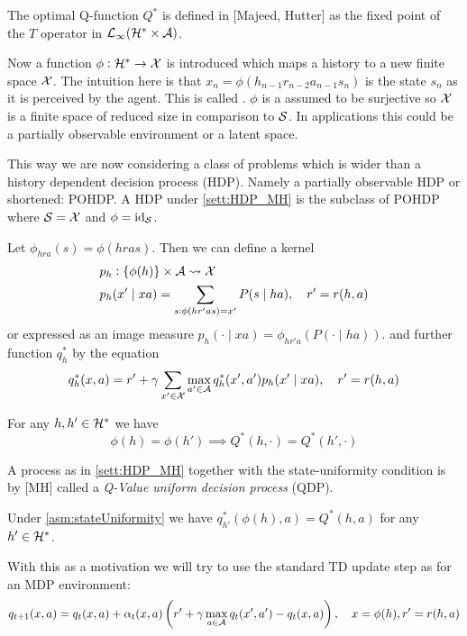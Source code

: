 The optimal Q-function $Q^*$ is defined in [Majeed, Hutter] as
the fixed point of the $T$ operator in
$\mathcal{L}_\infty(\mathcal{H}^* \times \mathcal{A})$.

Now a function $\phi : \mathcal{H}^* \to \mathcal{X}$ is introduced
which maps a history to a new finite space $\mathcal{X}$.
The intuition here is that $x_n = \phi(h_{n-1} r_{n-2} a_{n-1} s_n)$ is the
state $s_n$ as it is perceived by the agent.
This is called .
$\phi$ is a assumed to be surjective so $\mathcal{X}$ is a finite space of
reduced size in comparison to $\mathcal{S}$.
In applications this could be a partially observable environment
or a latent space.

This way we are now considering a class of problems
which is wider than a 
history dependent decision process (HDP).
Namely a partially observable HDP or shortened: POHDP.
A HDP under \cref{sett:HDP_MH} is the subclass of POHDP where
$\mathcal{S} = \mathcal{X}$ and $\phi = \text{id}_\mathcal{S}$.

Let $\phi_{hra}(s) = \phi(hras)$. Then we can define a kernel
\begin{align*} p_h & : \{\phi(h)\} \times \mathcal{A} \leadsto \mathcal{X}
  \\ p_h & (x' \mid xa)
  = \sum_{s:\phi(hr'as)=x'} P(s \mid ha), \quad r'=r(h,a)
\end{align*}
or expressed as an image measure
$p_h(\cdot \mid xa) = \phi_{hr'a}(P(\cdot \mid ha))$.
and further function $q_h^*$ by the equation
\[ q_h^*(x, a) = r' + \gamma \sum_{x' \in \mathcal{X}} 
\max_{a' \in \mathcal{A}} q^*_h(x', a')
p_h(x' \mid xa), \quad r'=r(h,a) \]

\begin{asm}
  For any $h,h' \in \mathcal{H}^*$ we have
  \[ \phi(h) = \phi(h') \implies Q^*(h, \cdot) = Q^*(h', \cdot) \]
  \label{asm:stateUniformity}
\end{asm}

A process as in \cref{sett:HDP_MH} together with the state-uniformity condition
is by [MH] called a \emph{Q-Value uniform decision process} (QDP).

\begin{thm}[Hutter, 2016]
  Under \cref{asm:stateUniformity} we have
  $q^*_{h'}(\phi(h), a) = Q^*(h, a)$ for any $h'\in \mathcal{H}^*$.
\end{thm}

With this as a motivation we will try to use
the standard TD update step as for an MDP environment:
\begin{equation}
  q_{t+1}(x, a) = q_t(x, a) + \alpha_t(x, a)
  \left(r' + \gamma \max_{a \in \mathcal{A}} q_t(x', a') - q_t(x, a)\right),
  \quad x = \phi(h), r' = r(h,a)
  \label{eq:updateStepMH}
\end{equation}

